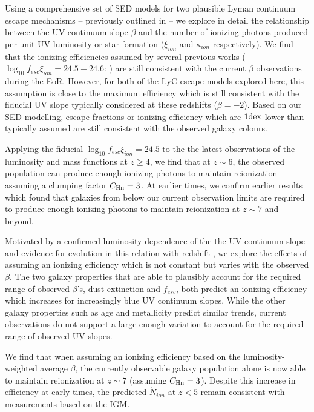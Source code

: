 Using a comprehensive set of SED models for two plausible Lyman continuum escape mechanisms -- previously outlined in \citet{Zackrisson:2013iz} -- we explore in detail the relationship between the UV continuum slope $\beta$ and the number of ionizing photons produced per unit UV luminosity or star-formation ($\xi_{ion}$ and $\kappa_{ion}$ respectively). We find that the ionizing efficiencies assumed by several previous works ($\log_{10} f_{esc}\xi_{ion} = 24.5-24.6$: \citet{Robertson:2013ji,Kuhlen:2012ka}) are still consistent with the current $\beta$ observations during the EoR. However, for both of the LyC escape models explored here, this assumption is close to the maximum efficiency which is still consistent with the fiducial UV slope typically considered at these redshifts ($\beta = -2$). Based on our SED modelling, escape fractions or ionizing efficiency which are $1 \rm{dex}$ lower than typically assumed are still consistent with the observed galaxy colours.

Applying the fiducial $\log_{10} f_{esc}\xi_{ion} = 24.5$ to the the latest observations of the luminosity and mass functions at $z\geq4$, we find that at $z\sim6$, the observed population can produce enough ionizing photons to maintain reionization assuming a clumping factor $C_{\textsc{Hii}} = 3$. At earlier times, we confirm earlier results  which found that galaxies from below our current observation limits are required to produce enough ionizing photons to maintain reionization at $z\sim7$ and beyond.

Motivated by a confirmed luminosity dependence of the the UV continuum slope and evidence for evolution in this relation with redshift \citep{Bouwens:2013vf,Rogers:2014bn}, we explore the effects of assuming an ionizing efficiency which is not constant but varies with the observed $\beta$. The two galaxy properties that are able to plausibly account for the required range of observed $\beta$'s, dust extinction and $f_{esc}$, both predict an ionizing efficiency which increases for increasingly blue UV continuum slopes. While the other galaxy properties such as age and metallicity predict similar trends, current observations do not support a large enough variation to account for the required range of observed UV slopes.

We find that when assuming an ionizing efficiency based on the luminosity-weighted average $\beta$, the currently observable galaxy population alone is now able to maintain reionization at $z\sim7$ (assuming $C_{\textsc{Hii}} = 3$). Despite this increase in efficiency at early times, the predicted $\dot{N}_{ion}$ at $z < 5$ remain consistent with measurements based on the IGM.

